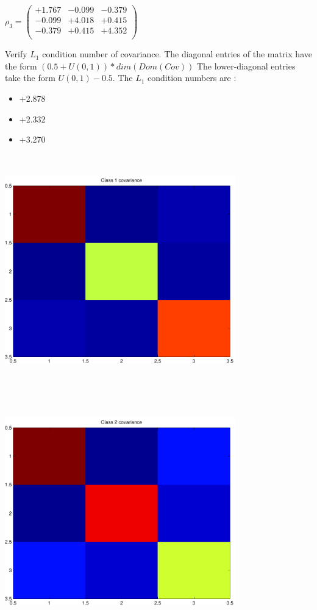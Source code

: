 \documentclass[9pt]{article}
\theoremstyle{plain}
\theoremstyle{definition}
\theoremstyle{remark}
\numberwithin{equation}{section}
\begin{document}
$\rho_3 = \left(
\begin{array}{
ccc}
+1.767 & -0.099 & -0.379 \\
-0.099 & +4.018 & +0.415 \\
-0.379 & +0.415 & +4.352 \\
\end{array}
\right)$ \newline 

Verify $L_1$ condition number of covariance. The diagonal entries of the matrix have the form $(0.5 + U(0,1) )*dim(Dom(Cov))$
The lower-diagonal entries take the form $U(0,1) - 0.5$. 
The $L_1$ condition numbers are :
\begin{itemize}
\item +2.878
\item +2.332
\item +3.270
\end{itemize}
\includegraphics[width=10.0cm,height=10.0cm]{rv1_corr.pdf}

\includegraphics[width=10.0cm,height=10.0cm]{rv2_corr.pdf}
\end{document}
